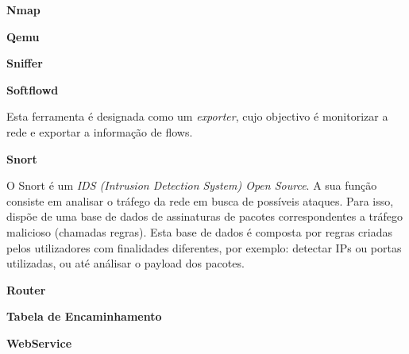 \begin{description}
    \item \textbf{Nmap}
\end{description}

\begin{description}
    \item \textbf{Qemu}
\end{description}

\begin{description}
    \item \textbf{Sniffer}
\end{description}

\begin{description}
    \item \textbf{Softflowd}

Esta ferramenta é designada como um \textit{exporter}, cujo objectivo é monitorizar a rede e exportar a informação de flows.
\end{description}

\begin{description}
    \item \textbf{Snort}

O Snort é um \textit{IDS (Intrusion Detection System) Open Source}. A sua função consiste em analisar o tráfego da rede em busca de possíveis ataques. Para isso, dispõe de uma base de dados de assinaturas de pacotes correspondentes a tráfego malicioso (chamadas regras). Esta base de dados é composta por regras criadas pelos utilizadores com finalidades diferentes, por exemplo: detectar IPs ou portas utilizadas, ou até análisar o payload dos pacotes.
\end{description}

\begin{description}
    \item \textbf{Router}
\end{description}

\begin{description}
    \item \textbf{Tabela de Encaminhamento}
\end{description}

\begin{description}
    \item \textbf{WebService}
\end{description}
